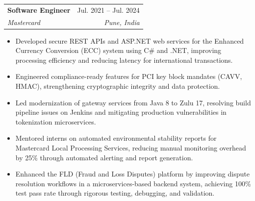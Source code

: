 \documentclass[letterpaper,11pt]{article}
\makeatletter
\newcommand{\resumeItem}[1]{
  \item\small{
    {#1 \vspace{-2pt}}
  }
}
\newcommand{\resumeSubheading}[4]{
  \vspace{-2pt}\item
    \begin{tabular*}{0.97\textwidth}[t]{l@{\extracolsep{\fill}}r}
      \textbf{#1} & #2 \\
      \textit{\small#3} & \textit{\small #4} \\
    \end{tabular*}\vspace{-7pt}
}
\newcommand{\resumeItemListStart}{\begin{itemize}[noitemsep, topsep=0pt, parsep=0pt]}
\newcommand{\resumeItemListEnd}{\end{itemize}\vspace{-5pt}}
\makeatother
\begin{document}

  \resumeSubheading
    {Software Engineer}{Jul. 2021 -- Jul. 2024}
    {Mastercard}{Pune, India}
    \resumeItemListStart
      \resumeItem{Developed secure REST APIs and ASP.NET web services for the Enhanced Currency Conversion (ECC) system using C\# and .NET, improving processing efficiency and reducing latency for international transactions.}
      \resumeItem{Engineered compliance-ready features for PCI key block mandates (CAVV, HMAC), strengthening cryptographic integrity and data protection.}
      \resumeItem{Led modernization of gateway services from Java 8 to Zulu 17, resolving build pipeline issues on Jenkins and mitigating production vulnerabilities in tokenization microservices.}
      \resumeItem{Mentored interns on automated environmental stability reports for Mastercard Local Processing Services, reducing manual monitoring overhead by 25\% through automated alerting and report generation.}
      \resumeItem{Enhanced the FLD (Fraud and Loss Disputes) platform by improving dispute resolution workflows in a microservices-based backend system, achieving 100\% test pass rate through rigorous testing, debugging, and validation.}
    \resumeItemListEnd

\end{document}
